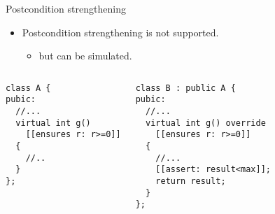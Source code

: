 \begin{frame}[t,fragile]{Postcondition strengthening}
\begin{itemize}
  \item Postcondition strengthening is not supported.
    \begin{itemize}
      \item but can be simulated.
    \end{itemize}
\end{itemize}

\vfill\pause
\begin{columns}[T]

\begin{lstlisting}
class A {
pubic:
  //...
  virtual int g()
    [[ensures r: r>=0]]
  {
    //..
  }
};
\end{lstlisting}

\begin{lstlisting}
class B : public A {
pubic:
  //...
  virtual int g() override
    [[ensures r: r>=0]]
  {
    //...
    [[assert: result<max]];
    return result;
  }
};
\end{lstlisting}

\end{columns}

\end{frame}
